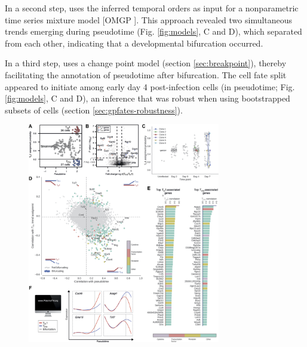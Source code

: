 In a second step,  uses the inferred temporal orders as input for a nonparametric time series mixture model [OMGP \cite{Lazaro-Gredilla2012-ta}]. This approach revealed two simultaneous trends emerging during pseudotime (Fig. \ref{fig:models}, C and D), which separated from each other, indicating that a developmental bifurcation occurred.

In a third step,  uses a change point model (section \ref{sec:breakpoint}), thereby facilitating the annotation of pseudotime after bifurcation. The cell fate split appeared to initiate among early day 4 post-infection cells (in pseudotime; Fig. \ref{fig:models}, C and D), an inference that was robust when using bootstrapped subsets of cells (section \ref{sec:gpfates-robustness}).

\begin{figure}
    \centering
    \includegraphics[width=0.75\textwidth]{"Fig3"}

\end{figure}

